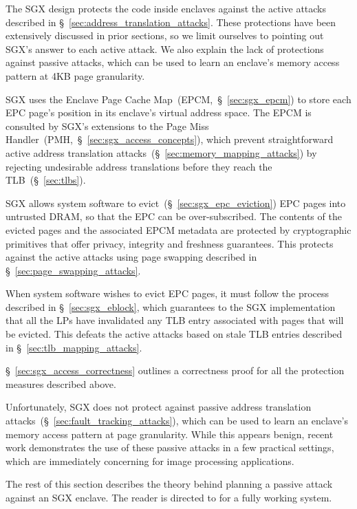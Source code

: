 The SGX design protects the code inside enclaves against the active attacks
described in \S~\ref{sec:address_translation_attacks}. These protections have
been extensively discussed in prior sections, so we limit ourselves to
pointing out SGX's answer to each active attack. We also explain the lack of
protections against passive attacks, which can be used to learn an enclave's
memory access pattern at 4KB page granularity.

SGX uses the Enclave Page Cache Map~(EPCM,~\S~\ref{sec:sgx_epcm}) to store each
EPC page's position in its enclave's virtual address space. The EPCM is
consulted by SGX's extensions to the Page Miss
Handler~(PMH,~\S~\ref{sec:sgx_access_concepts}), which prevent straightforward
active address translation attacks~(\S~\ref{sec:memory_mapping_attacks}) by
rejecting undesirable address translations before they reach the
TLB~(\S~\ref{sec:tlbs}).

SGX allows system software to evict~(\S~\ref{sec:sgx_epc_eviction}) EPC pages
into untrusted DRAM, so that the EPC can be over-subscribed. The contents of
the evicted pages and the associated EPCM metadata are protected by
cryptographic primitives that offer privacy, integrity and freshness
guarantees. This protects against the active attacks using page swapping
described in \S~\ref{sec:page_swapping_attacks}.

When system software wishes to evict EPC pages, it must follow the process
described in \S~\ref{sec:sgx_eblock}, which guarantees to the SGX
implementation that all the LPs have invalidated any TLB entry associated with
pages that will be evicted. This defeats the active attacks based on stale TLB
entries described in \S~\ref{sec:tlb_mapping_attacks}.

\S~\ref{sec:sgx_access_correctness} outlines a correctness proof for all the
protection measures described above.

Unfortunately, SGX does not protect against passive address translation
attacks~(\S~\ref{sec:fault_tracking_attacks}), which can be used to learn an
enclave's memory access pattern at page granularity. While this appears
benign, recent work \cite{xu2015pagefaults} demonstrates the use of these
passive attacks in a few practical settings, which are immediately concerning
for image processing applications.

The rest of this section describes the theory behind planning a passive attack
against an SGX enclave. The reader is directed to \cite{xu2015pagefaults} for
a fully working system.


